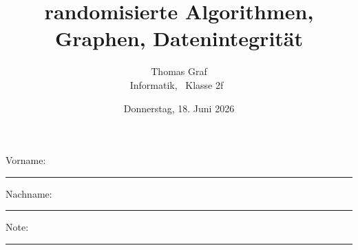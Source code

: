 \newtoggle{withbonus}

\newcommand{\mycourse}{Informatik}

\newcommand{\myclass}{\faPeace\faIceCream~Klasse 2f~\faIceCream\faPeace}

\newcommand{\mydate}{Donnerstag, 18. Juni 2026}

\title{\textbf{randomisierte Algorithmen, Graphen, Datenintegrität}}
\author{Thomas Graf\\
\mycourse, \myclass}
\date{\mydate}
\maketitle
\thispagestyle{headandfoot}

\begin{center}
\end{center}

\vspace{10mm}

\begin{center}
	Vorname: \rule{45mm}{0.8pt}\qquad Nachname: \rule{45mm}{0.8pt}
\end{center}

\vspace{20mm}

\begin{center}
	\iftoggle{withbonus}{
		\combinedgradetable[h][questions]
	}{
		\gradetable[h][questions]
	}
\end{center}

\vspace{15mm}

\begin{center}
	Note:
	\vspace{10mm}

	\rule{8mm}{1.2pt}
\end{center}

